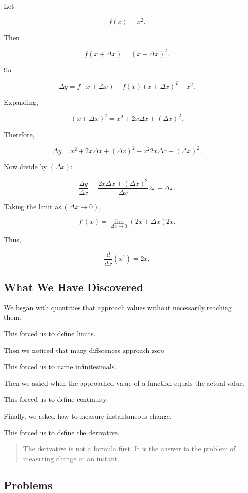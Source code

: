 Let

\[
f(x)=x^2.
\]

Then

\[
f(x+\Delta x)=(x+\Delta x)^2.
\]

So

\[
\Delta y = f(x+\Delta x)-f(x) (x+\Delta x)^2-x^2.
\]

Expanding,

\[
(x+\Delta x)^2=x^2+2x\Delta x+(\Delta x)^2.
\]

Therefore,

\[
\Delta y = x^2+2x\Delta x+(\Delta x)^2-x^2 2x\Delta x+(\Delta x)^2.
\]

Now divide by $(\Delta x)$:

\[
\frac{\Delta y}{\Delta x} = \frac{2x\Delta x+(\Delta x)^2}{\Delta x} 2x+\Delta x.
\]

Taking the limit as $(\Delta x\to 0)$,

\[
f'(x) = \lim_{\Delta x\to 0}(2x+\Delta x)2x.
\]

Thus,

\[
\frac{d}{dx}(x^2)=2x.
\]

\subsection{What We Have Discovered}

We began with quantities that approach values without necessarily reaching them.

This forced us to define limits.

Then we noticed that many differences approach zero.

This forced us to name infinitesimals.

Then we asked when the approached value of a function equals the actual value.

This forced us to define continuity.

Finally, we asked how to measure instantaneous change.

This forced us to define the derivative.

\begin{quote}
The derivative is not a formula first. It is the answer to the problem of measuring change at an instant.
\end{quote}

\subsection{Problems}

